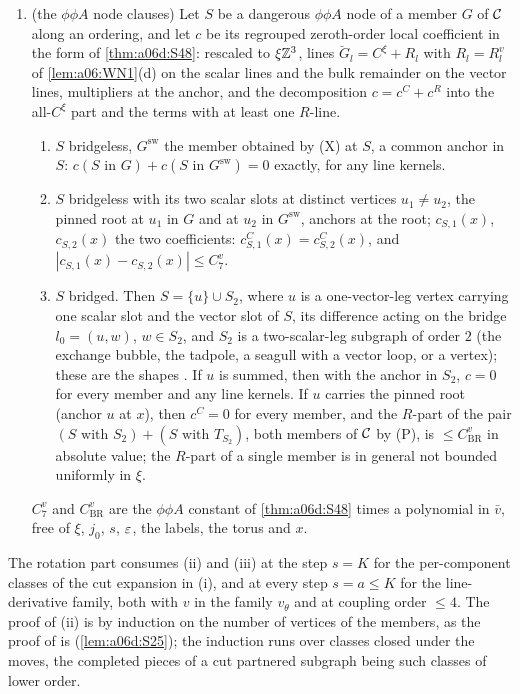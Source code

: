 \begin{theorem}
\begin{enumerate}[label=\textup{(\roman*)},nosep,leftmargin=*]
\item\textup{(the $\phi\phi A$ node clauses)} Let $S$ be a dangerous $\phi\phi A$ node of a member $G$ of $\mathcal C$ along an ordering, and let $c$ be its regrouped zeroth-order local coefficient in the form of \cref{thm:a06d:S48}: rescaled to $\xi\mathbb Z^3$, lines $\breve G_l=C^\xi+R_l$ with $R_l=R^v_l$ of \cref{lem:a06:WN1}(d) on the scalar lines and the bulk remainder on the vector lines, multipliers at the anchor, and the decomposition $c=c^C+c^R$ into the all-$C^\xi$ part and the terms with at least one $R$-line.
\begin{enumerate}[label=\textup{(\alph*)},nosep,leftmargin=*]
\item $S$ bridgeless, $G^{\mathrm{sw}}$ the member obtained by \textup{(X)} at $S$, a common anchor in $S$: $c(S\text{ in }G)+c(S\text{ in }G^{\mathrm{sw}})=0$ exactly, for any line kernels.
\item $S$ bridgeless with its two scalar slots at distinct vertices $u_1\ne u_2$, the pinned root at $u_1$ in $G$ and at $u_2$ in $G^{\mathrm{sw}}$, anchors at the root; $c_{S,1}(x)$, $c_{S,2}(x)$ the two coefficients: $c^C_{S,1}(x)=c^C_{S,2}(x)$, and $|c_{S,1}(x)-c_{S,2}(x)|\le C^v_7$.
\item $S$ bridged. Then $S=\{u\}\cup S_2$, where $u$ is a one-vector-leg vertex \cite[(1.8)]{Ba3} carrying one scalar slot and the vector slot of $S$, its difference acting on the bridge $l_0=(u,w)$, $w\in S_2$, and $S_2$ is a two-scalar-leg subgraph of order $2$ (the exchange bubble, the \cite[(1.6)]{Ba3} tadpole, a seagull with a vector loop, or a \cite[(1.7)]{Ba3} vertex); these are the shapes \cite[(2.21b)--(g)]{Ba3}. If $u$ is summed, then with the anchor in $S_2$, $c=0$ for every member and any line kernels. If $u$ carries the pinned root (anchor $u$ at $x$), then $c^C=0$ for every member, and the $R$-part of the pair $(S\text{ with }S_2)+(S\text{ with }T_{S_2})$, both members of $\mathcal C$ by \textup{(P)}, is $\le C^v_{\mathrm{BR}}$ in absolute value; the $R$-part of a single member is in general not bounded uniformly in $\xi$.
\end{enumerate}
$C^v_7$ and $C^v_{\mathrm{BR}}$ are the $\phi\phi A$ constant of \cref{thm:a06d:S48} times a polynomial in $\bar v$, free of $\xi$, $j_0$, $s$, $\varepsilon$, the labels, the torus and $x$.
\end{enumerate}
\end{theorem}

The rotation part consumes (ii) and (iii) at the step $s=K$ for the per-component classes of the cut expansion in (i), and at every step $s=a\le K$ for the line-derivative family, both with $v$ in the family $v_\theta$ and at coupling order $\le4$. The proof of (ii) is by induction on the number of vertices of the members, as the proof of \cite[(1.33)]{Ba3} is (\cref{lem:a06d:S25}); the induction runs over classes closed under the moves, the completed pieces of a cut partnered subgraph being such classes of lower order.

